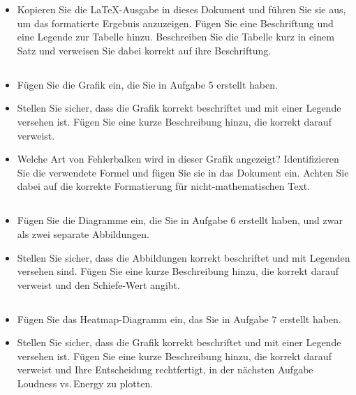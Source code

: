 \documentclass[
	german,
	accentcolor=9c,%
	type=intern,
	marginpar=false
	]{tudapub}
\begin{document}
\begin{itemize}
\item Kopieren Sie die LaTeX-Ausgabe in dieses Dokument und führen Sie sie aus, um das formatierte Ergebnis anzuzeigen. Fügen Sie eine Beschriftung und eine Legende zur Tabelle hinzu. Beschreiben Sie die Tabelle kurz in einem Satz und verweisen Sie dabei korrekt auf ihre Beschriftung.
\end{itemize}

\subsection{}
\begin{itemize}
\item Fügen Sie die Grafik ein, die Sie in Aufgabe 5 erstellt haben.
\item Stellen Sie sicher, dass die Grafik korrekt beschriftet und mit einer Legende versehen ist. Fügen Sie eine kurze Beschreibung hinzu, die korrekt darauf verweist.
\item Welche Art von Fehlerbalken wird in dieser Grafik angezeigt? Identifizieren Sie die verwendete Formel und fügen Sie sie in das Dokument ein. Achten Sie dabei auf die korrekte Formatierung für nicht-mathematischen Text.
\end{itemize}

\subsection{}
\begin{itemize}
\item Fügen Sie die Diagramme ein, die Sie in Aufgabe 6 erstellt haben, und zwar als zwei separate Abbildungen.
\item Stellen Sie sicher, dass die Abbildungen korrekt beschriftet und mit Legenden versehen sind. Fügen Sie eine kurze Beschreibung hinzu, die korrekt darauf verweist und den Schiefe-Wert angibt.
\end{itemize}

\subsection{}
\begin{itemize}
\item Fügen Sie das Heatmap-Diagramm ein, das Sie in Aufgabe 7 erstellt haben. 
\item Stellen Sie sicher, dass die Grafik korrekt beschriftet und mit einer Legende versehen ist. Fügen Sie eine kurze Beschreibung hinzu, die korrekt darauf verweist und Ihre Entscheidung rechtfertigt, in der nächsten Aufgabe Loudness vs.\,Energy zu plotten.
\end{itemize}
\end{document}
